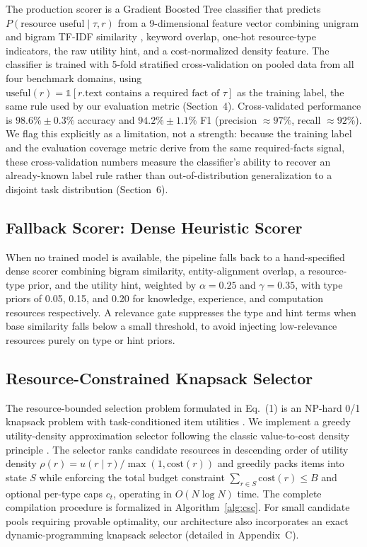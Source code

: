 \documentclass{article}
\begin{document}
The production scorer is a Gradient Boosted Tree classifier \citep{chen2016xgboost} that predicts $P(\text{resource useful} \mid \tau, r)$ from a 9-dimensional feature vector combining unigram and bigram TF-IDF similarity \citep{pedregosa2011scikit}, keyword overlap, one-hot resource-type indicators, the raw utility hint, and a cost-normalized density feature. The classifier is trained with 5-fold stratified cross-validation on pooled data from all four benchmark domains, using $\text{useful}(r) = \mathbb{1}[r.\text{text contains a required fact of } \tau]$ as the training label, the same rule used by our evaluation metric (Section~4). Cross-validated performance is $98.6\% \pm 0.3\%$ accuracy and $94.2\% \pm 1.1\%$ F1 (precision $\approx 97\%$, recall $\approx 92\%$). We flag this explicitly as a limitation, not a strength: because the training label and the evaluation coverage metric derive from the same required-facts signal, these cross-validation numbers measure the classifier's ability to recover an already-known label rule rather than out-of-distribution generalization to a disjoint task distribution (Section~6).

\subsection{Fallback Scorer: Dense Heuristic Scorer}

When no trained model is available, the pipeline falls back to a hand-specified dense scorer combining bigram similarity, entity-alignment overlap, a resource-type prior, and the utility hint, weighted by $\alpha = 0.25$ and $\gamma = 0.35$, with type priors of 0.05, 0.15, and 0.20 for knowledge, experience, and computation resources respectively. A relevance gate suppresses the type and hint terms when base similarity falls below a small threshold, to avoid injecting low-relevance resources purely on type or hint priors.

\subsection{Resource-Constrained Knapsack Selector}

The resource-bounded selection problem formulated in Eq.~(1) is an NP-hard 0/1 knapsack problem with task-conditioned item utilities \citep{martello1990knapsack}. We implement a greedy utility-density approximation selector following the classic value-to-cost density principle \citep{dantzig1957discrete}. The selector ranks candidate resources in descending order of utility density $\rho(r) = u(r \mid \tau) / \max(1, \text{cost}(r))$ and greedily packs items into state $S$ while enforcing the total budget constraint $\sum_{r \in S} \text{cost}(r) \leq B$ and optional per-type caps $c_t$, operating in $O(N \log N)$ time. The complete compilation procedure is formalized in Algorithm~\ref{alg:csc}. For small candidate pools requiring provable optimality, our architecture also incorporates an exact dynamic-programming knapsack selector (detailed in Appendix~C).
\end{document}
